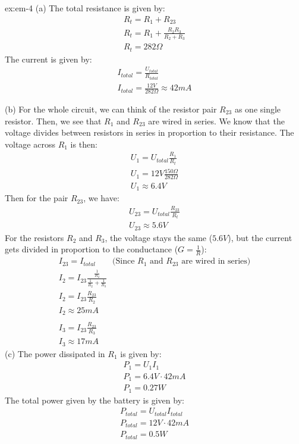 \begin{solution}{ex:em-4}
  (a) The total resistance is given by:
  \[
    \begin{gathered}
      R_t=R_1+R_{23}\\
      R_t=R_1+\frac{R_2R_3}{R_2+R_3}\\
      R_t=282 \Omega
    \end{gathered}
  \]
  The current is given by:
  \[
    \begin{gathered}
      I_{total}=\frac{U_{total}}{R_{total}}\\
      I_{total}=\frac{12V}{282\Omega}\approx42mA
    \end{gathered}
  \]

  (b) For the whole circuit, we can think of the resistor pair $R_{23}$ as one single resistor. Then, we see that $R_1$ and $R_{23}$ are wired in series. We know that the voltage divides between resistors in series in proportion to their resistance. The voltage across $R_1$ is then:
  \[
    \begin{gathered}
      U_1=U_{total}\frac{R_1}{R_t}\\
      U_1=12V \frac{150\Omega}{282\Omega}\\
      U_1\approx6.4V
    \end{gathered}
  \]
    Then for the pair $R_{23}$, we have:
    \[
      \begin{gathered}
        U_{23}=U_{total}\frac{R_{23}}{R_t}\\
        U_{23}\approx5.6V
      \end{gathered}
    \]
    For the resistors $R_2$ and $R_3$, the voltage stays the same ($5.6V$), but the current gets divided in proportion to the conductance ($G=\frac{1}{R}$):
    \[
      \begin{gathered}
        I_{23}=I_{total} \qquad\text{(Since $R_1$ and $R_{23}$ are wired in series)}\\
        I_{2}=I_{23} \frac{\frac{1}{R_2}}{\frac{1}{R_2}+\frac{1}{R_3}}\\
        I_{2}=I_{23} \frac{R_{23}}{R_2}\\
        I_2\approx 25 mA\\\\
        I_3=I_{23}\frac{R_{23}}{R_3}\\
        I_3\approx17mA
      \end{gathered}
    \]
    (c)
    The power dissipated in $R_1$ is given by:
    \[
      \begin{gathered}
        P_1=U_1I_1\\
        P_1=6.4V\cdot 42mA\\
        P_1=0.27W
      \end{gathered}
    \]
    The total power given by the battery is given by:
    \[
      \begin{gathered}
      P_{total}=U_{total}I_{total}\\
      P_{total}=12V \cdot 42mA\\
      P_{total}=0.5W
      \end{gathered}
    \]
\end{solution}
